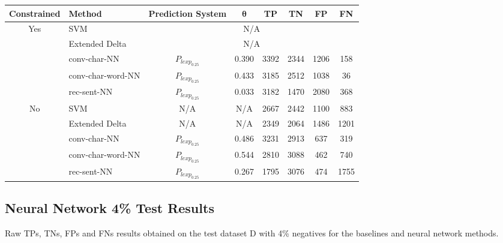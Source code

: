 \begin{adjustbox}{center}
\begin{tabular}{|c|l|c|c|c|c|c|c|}
\hline
    \textbf{Constrained} & \textbf{Method} & \textbf{Prediction System} & $\mathbf{\theta}$ & \textbf{\gls{TP}} & \textbf{\gls{TN}} & \textbf{\gls{FP}} & \textbf{\gls{FN}} \\ \hline
\multirow{5}{*}{Yes} & SVM                     & \multicolumn{6}{c|}{N/A}                                                                     \\ \cline{2-8} 
                     & Extended Delta          & \multicolumn{6}{c|}{N/A}                                                                     \\ \cline{2-8} 
                     & \gls{conv-char-NN}      & $P_{lexp_{0.25}}$ & 0.390    & 3392 & 2344 & 1206 & 158  \\ \cline{2-8}
                     & \gls{conv-char-word-NN} & $P_{lexp_{0.25}}$ & 0.433    & 3185 & 2512 & 1038 & 36   \\ \cline{2-8} 
                     & \gls{rec-sent-NN}       & $P_{lexp_{0.25}}$ & 0.033    & 3182 & 1470 & 2080 & 368  \\ \hline\hline
\multirow{5}{*}{No}  & SVM                     & N/A               & N/A      & 2667 & 2442 & 1100 & 883  \\ \cline{2-8} 
                     & Extended Delta          & N/A               & N/A      & 2349 & 2064 & 1486 & 1201 \\ \cline{2-8} 
                     & \gls{conv-char-NN}      & $P_{lexp_{0.25}}$ & 0.486    & 3231 & 2913 & 637  & 319  \\ \cline{2-8} 
                     & \gls{conv-char-word-NN} & $P_{lexp_{0.25}}$ & 0.544    & 2810 & 3088 & 462  & 740  \\ \cline{2-8} 
                     & \gls{rec-sent-NN}       & $P_{lexp_{0.25}}$ & 0.267    & 1795 & 3076 & 474  & 1755 \\ \hline
\end{tabular}
\end{adjustbox}

\subsection{Neural Network 4\% Test Results}
\label{subsec:neural-network-4-test-results}

Raw \glspl{TP}, \glspl{TN}, \glspl{FP} and \glspl{FN} results obtained on the
test dataset \gls{D} with 4\% negatives for the baselines and neural network
methods.

